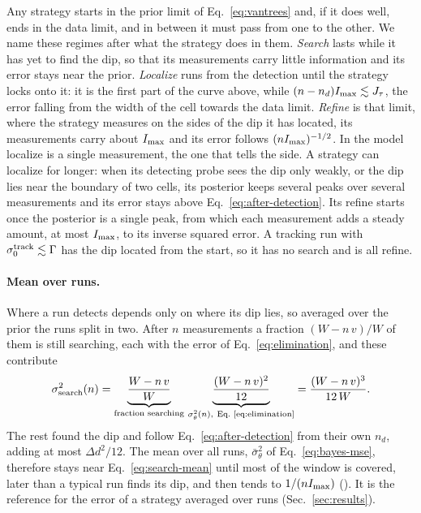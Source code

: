 Any strategy starts in the prior limit of Eq.~\eqref{eq:vantrees} and, if it does well, ends in the data limit, and in
between it must pass from one to the other. We name these regimes after what the strategy does in them.
\emph{Search} lasts while it has yet to find the dip, so that its measurements carry little information and its error
stays near the prior. \emph{Localize} runs from the detection until the strategy locks onto it: it is
the first part of the curve above, while $(n-n_d)I_{\rm max}\lesssim J_\tau$, the error falling from the width of the
cell towards the data limit. \emph{Refine} is that limit, where the strategy measures on the sides of the dip it has
located, its measurements carry about $I_{\rm max}$ and its error follows $(nI_{\rm max})^{-1/2}$. In the model localize is a
single measurement, the one that tells the side. A strategy can localize for longer: when its detecting probe sees
the dip only weakly, or the dip lies near the boundary of two cells, its posterior keeps several peaks over several
measurements and its error stays above Eq.~\eqref{eq:after-detection}. Its refine starts once the posterior is a
single peak, from which each measurement adds a steady amount, at most $I_{\rm max}$, to its inverse squared error.
A tracking run with $\sigma_0^{\rm track}\lesssim\Gamma$ has the dip located from the start, so it has no search and
is all refine.

\paragraph{Mean over runs.} Where a run detects depends only on where its dip lies, so averaged over the prior the
runs split in two. After $n$ measurements a fraction $(W-n\,v)/W$ of them is still searching, each with the error of
Eq.~\eqref{eq:elimination}, and these contribute
\begin{equation}
  \sigma_{\rm search}^2(n)=\underbrace{\frac{W-n\,v}{W}}_{\text{fraction searching}}\,
  \underbrace{\frac{(W-n\,v)^2}{12}}_{\sigma_\theta^2(n),\ \text{Eq.~\eqref{eq:elimination}}}
  =\frac{(W-n\,v)^3}{12\,W}.
  \label{eq:search-mean}
\end{equation}
The rest found the dip and follow Eq.~\eqref{eq:after-detection} from their own $n_d$, adding at most
$\Delta d^2/12$. The mean over all runs, $\bar\sigma_\theta^2$ of Eq.~\eqref{eq:bayes-mse}, therefore stays near
Eq.~\eqref{eq:search-mean} until most of the window is covered, later than a typical run finds its dip, and then tends
to $1/(nI_{\rm max})$ (). It is the reference for the error of a strategy
averaged over runs (Sec.~\ref{sec:results}).


